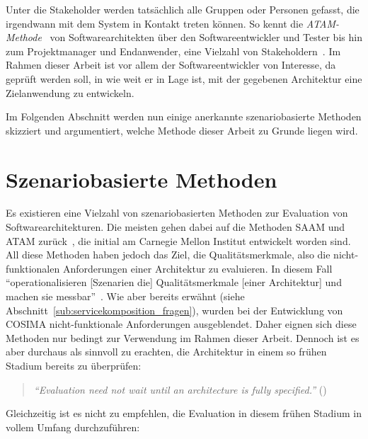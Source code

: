   Unter die Stakeholder werden tatsächlich alle Gruppen oder Personen gefasst, die irgendwann mit dem System in Kontakt treten können. So kennt die \emph{ATAM-Methode}~ von Softwarearchitekten über den Softwareentwickler und Tester bis hin zum Projektmanager und Endanwender, eine Vielzahl von Stakeholdern~\citep[S. 63ff]{evaluating_software_architectures}. Im Rahmen dieser Arbeit ist vor allem der Softwareentwickler von Interesse, da geprüft werden soll, in wie weit er in Lage ist, mit der gegebenen Architektur eine Zielanwendung zu entwickeln.
  
  Im Folgenden Abschnitt werden nun einige anerkannte szenariobasierte Methoden skizziert und argumentiert, welche Methode dieser Arbeit zu Grunde liegen wird.

  
\section{Szenariobasierte Methoden} %
\label{sec:szenariobasierte_methoden}

  Es existieren eine Vielzahl von szenariobasierten Methoden zur Evaluation von Softwarearchitekturen. Die meisten gehen dabei auf die Methoden SAAM und ATAM zurück~\citep[S. 1]{scenario_based_software_architecture_evaluation_methods}, die initial am Carnegie Mellon Institut entwickelt worden sind. All diese Methoden haben jedoch das Ziel, die Qualitätsmerkmale, also die nicht-funktionalen Anforderungen einer Architektur zu evaluieren. In diesem Fall "`operationalisieren [Szenarien die] Qualitätsmerkmale [einer Architektur] und machen sie messbar"'~\citep[S. 61]{effektive_software_architekturen}. Wie aber bereits erwähnt (siehe Abschnitt~\ref{sub:servicekomposition_fragen}), wurden bei der Entwicklung von COSIMA nicht-funktionale Anforderungen ausgeblendet. Daher eignen sich diese Methoden nur bedingt zur Verwendung im Rahmen dieser Arbeit. Dennoch ist es aber durchaus als sinnvoll zu erachten, die Architektur in einem so frühen Stadium bereits zu überprüfen:
  
  \begin{quote}
    \emph{"`Evaluation need not wait until an architecture is fully specified."'} (\citep[S. 24]{evaluating_software_architectures})
  \end{quote}
  
  Gleichzeitig ist es nicht zu empfehlen, die Evaluation in diesem frühen Stadium in vollem Umfang durchzuführen:
  
